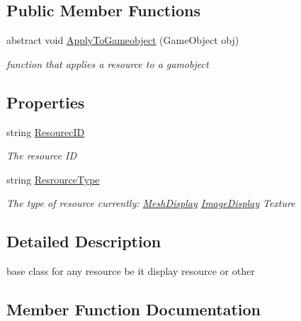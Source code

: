 \subsection*{Public Member Functions}
\begin{DoxyCompactItemize}
\item 
abstract void \mbox{\hyperlink{class_base_resource_a2d832c8042114da9e3f6240651d59703}{Apply\+To\+Gameobject}} (Game\+Object obj)
\begin{DoxyCompactList}\small\item\em function that applies a resource to a gamobject \end{DoxyCompactList}\end{DoxyCompactItemize}
\subsection*{Properties}
\begin{DoxyCompactItemize}
\item 
string \mbox{\hyperlink{class_base_resource_a947dc7c31c7b98089aa6f560f90c4cb3}{Resourec\+ID}}
\begin{DoxyCompactList}\small\item\em The resource ID \end{DoxyCompactList}\item 
string \mbox{\hyperlink{class_base_resource_a226a36a32013947cb069e023324cd3af}{Resrource\+Type}}
\begin{DoxyCompactList}\small\item\em The type of resource currently\+: \mbox{\hyperlink{class_mesh_display}{Mesh\+Display}} \mbox{\hyperlink{class_image_display}{Image\+Display}} Texture \end{DoxyCompactList}\end{DoxyCompactItemize}


\subsection{Detailed Description}
base class for any resource be it display resource or other 



\subsection{Member Function Documentation}
\mbox{\label{class_base_resource_a2d832c8042114da9e3f6240651d59703}} 
